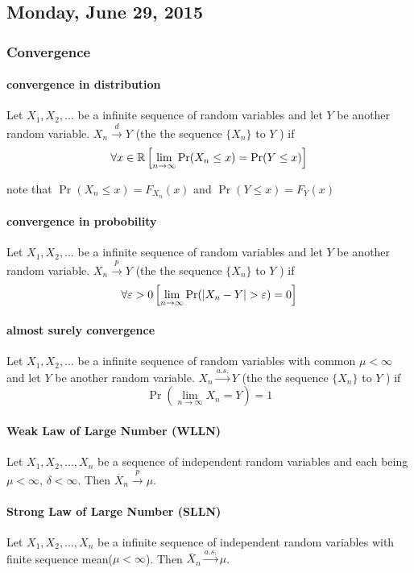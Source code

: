 \subsection{Monday, June 29, 2015}



\subsubsection{Convergence}
\paragraph{convergence in distribution}
Let $X_1, X_2, \ldots$ be a infinite sequence of random variables
and let $Y$ be another random variable.
$X_n\xrightarrow{d} Y$ (the the sequence $\{X_n\}$  to $Y$ ) if
\[\forall x\in{\mathbb R} \left[\lim_{n\to\infty} \Pr(X_n\leq x) = \Pr(Y\leq x)\right]\]

note that $\Pr(X_n\leq x) = F_{X_n}(x)$ and $\Pr(Y\leq x) = F_Y(x)$

\paragraph{convergence in probobility}
Let $X_1, X_2, \ldots$ be a infinite sequence of random variables
and let $Y$ be another random variable.
$X_n\xrightarrow{p} Y$ (the the sequence $\{X_n\}$  to $Y$ ) if
\[\forall \eps > 0 \left[\lim_{n\to\infty} \Pr(|X_n-Y|>\eps) = 0\right]\]

\paragraph{almost surely convergence}
Let $X_1, X_2, \ldots$ be a infinite sequence of random variables with common $\mu<\infty$
and let $Y$ be another random variable.
$X_n\xrightarrow{a.s.} Y$ (the the sequence $\{X_n\}$  to $Y$ ) if
\[\Pr\left(\lim_{n\to\infty} X_n = Y\right) = 1\]

\paragraph{Weak Law of Large Number (WLLN)}
Let $X_1, X_2, \ldots, X_n$ be a sequence of independent random variables
and each being $\mu<\infty$, $\delta<\infty$.
Then $\overline{X}_n\xrightarrow{p}\mu$.

\paragraph{Strong Law of Large Number (SLLN)}
Let $X_1, X_2, \ldots, X_n$ be a infinite sequence of independent random variables with finite sequence mean($\mu<\infty$).
Then $\overline{X}_n\xrightarrow{a.s.}\mu$.



